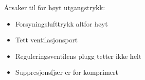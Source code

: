 Årsaker til for høyt utgangstrykk:

\begin{itemize}
\item{} Forsyningslufttrykk altfor høyt
\item{} Tett ventilasjonsport
\item{} Reguleringsventilens plugg tetter ikke helt
\item{} Suppresjonsfjær er for komprimert
\end{itemize}










